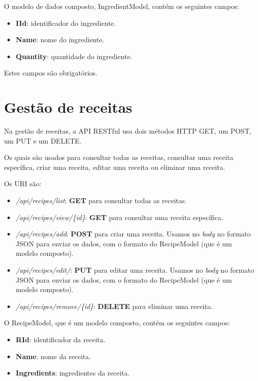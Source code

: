 O modelo de dados composto, IngredientModel, contém os seguintes
campos:

\begin{itemize}
  \item \textbf{IId}: identificador do ingrediente.
  \item \textbf{Name}: nome do ingrediente.
  \item \textbf{Quantity}: quantidade do ingrediente.
\end{itemize}

Estes campos são obrigatórios.

\section{Gestão de receitas}

Na gestão de receitas, a API RESTful usa dois métodos HTTP GET, um POST, um PUT e um DELETE.

Os quais são usados para consultar todas as receitas, consultar uma receita específica, criar uma receita, editar uma receita ou eliminar uma receita.

Os URI são:

\begin{itemize}
  \item \textit{/api/recipes/list}: \textbf{GET} para consultar todas as receitas.
  \item \textit{/api/recipes/view/\{id\}}: \textbf{GET} para consultar uma receita específica.
  \item \textit{/api/recipes/add}: \textbf{POST} para criar uma receita. Usamos no \textit{body} no formato JSON para enviar os dados, com o formato do RecipeModel (que é um modelo composto).
  \item \textit{/api/recipes/edit/}: \textbf{PUT} para editar uma receita. Usamos no \textit{body} no formato JSON para enviar os dados, com o formato do RecipeModel (que é um modelo composto).
  \item \textit{/api/recipes/remove/\{id\}}: \textbf{DELETE} para eliminar uma receita.
\end{itemize}

O RecipeModel, que é um modelo composto, contém os seguintes campos:

\begin{itemize}
  \item \textbf{RId}: identificador da receita.
  \item \textbf{Name}: nome da receita.
  \item \textbf{Ingredients}: ingredientes da receita.
\end{itemize}


